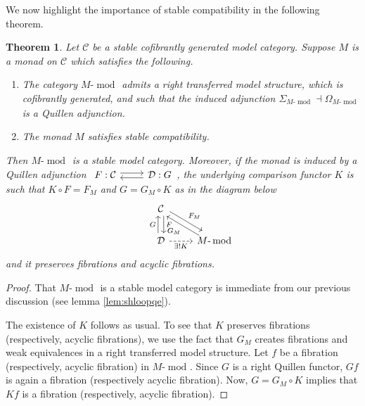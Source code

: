 \documentclass{article}
\newcommand{\cC}{\mathcal{C}}
\newcommand{\cD}{\mathcal{D}}
\newcommand{\adjunction}[4]{\begin{tikzcd}[ampersand replacement=\&] #1 : #2 \arrow[r, shift left] \& #3 : #4 \arrow[l, shift left] \end{tikzcd}}
\newcommand{\module}[2][]{#2\text{-}\modop_{#1}}
\DeclareMathOperator{\modop}{mod}
\newtheorem{theorem}{Theorem}[section]
\theoremstyle{definition}
\theoremstyle{remark}
\begin{document}
We now highlight the importance of stable compatibility in the following theorem.
\begin{theorem} \label{the:stabcomp}
  Let $\cC$ be a stable cofibrantly generated model category.
  Suppose $M$ is a monad on $\cC$ which satisfies the following.
  \begin{enumerate}
    \item
      The category $\module{M}$ admits a right transferred model structure, which is 
      cofibrantly generated, and such that the induced adjunction $\Sigma_{\module{M}}
      \dashv \Omega_{\module{M}}$ is a Quillen adjunction. 
    \item The monad $M$ satisfies stable compatibility.
  \end{enumerate}
  Then $\module{M}$ is a stable model category. Moreover, if the monad is induced by a
  Quillen adjunction $\adjunction{F}{\cC}{\cD}{G}$, the underlying comparison functor $K$
  is such that $K \circ F=F_{M}$ and $G=G_{M} \circ K$ as in the diagram below   
  \[
    \begin{tikzcd}
      & \cC  \arrow[dr,"F_{M}", shift left=1mm] \arrow[d,"F", shift left=1mm] \\
      & \cD \arrow[dashrightarrow,r,"\exists !K" below] \arrow[u,"G",shift left=1mm]& \module{M} \arrow[ul, "G_{M}",shift left=1mm] 
    \end{tikzcd}
  \]
  and it preserves fibrations and acyclic fibrations.
\end{theorem}

\begin{proof}
  That $\module{M}$ is a stable model category is immediate from our previous discussion (see lemma \ref{lem:shloopqe}). 
   
   The existence of $K$ follows as usual. To see that $K$ preserves fibrations (respectively, acyclic fibrations),
   we use the fact that $G_{M}$ creates fibrations and weak equivalences in a right transferred model structure.
   Let $f$ be a fibration (respectively, acyclic fibration) in $\module{M}$. Since $G$ is a right Quillen functor, 
   $Gf$ is again a fibration (respectively acyclic fibration). Now, $G=G_{M} \circ K$ implies that $Kf$ is a 
   fibration (respectively, acyclic fibration).  
\end{proof}
\end{document}
